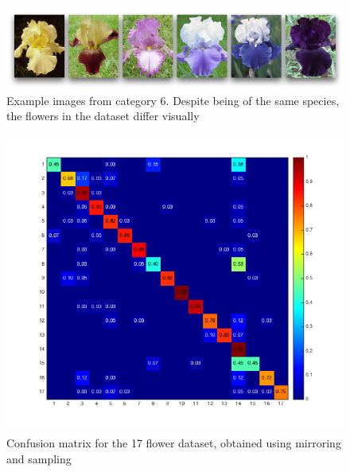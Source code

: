 \documentclass[11pt, a4paper]{report}
\begin{document}
\begin{figure}[hbt]
	\centering
  \includegraphics[totalheight=4cm]{img/37.png}
  \caption{Example images from category 6. Despite being of the same species, the flowers in the dataset differ visually}
  \label{img:37}
\end{figure}




\begin{figure}[hbt]
	\centering
  \includegraphics[totalheight=10cm]{img/31.png}
  \caption{Confusion matrix for the 17 flower dataset, obtained using mirroring and sampling}
  \label{img:31}
\end{figure}
\end{document}
